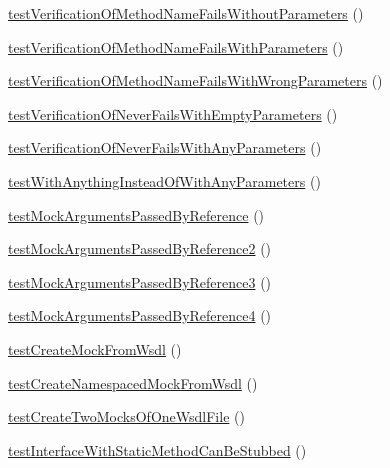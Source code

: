 \begin{DoxyCompactItemize}
\item 
\mbox{\hyperlink{class_framework___mock_object_test_a8fd03f63f74f80e57e0f8313264406ce}{test\+Verification\+Of\+Method\+Name\+Fails\+Without\+Parameters}} ()
\item 
\mbox{\hyperlink{class_framework___mock_object_test_aceab1647e23156ae20515dfc5da0297e}{test\+Verification\+Of\+Method\+Name\+Fails\+With\+Parameters}} ()
\item 
\mbox{\hyperlink{class_framework___mock_object_test_a8bfaa14e7994fda577f1da99ee80ef9d}{test\+Verification\+Of\+Method\+Name\+Fails\+With\+Wrong\+Parameters}} ()
\item 
\mbox{\hyperlink{class_framework___mock_object_test_a7ede9367c10f90c85b379d24b1d5134f}{test\+Verification\+Of\+Never\+Fails\+With\+Empty\+Parameters}} ()
\item 
\mbox{\hyperlink{class_framework___mock_object_test_abecd95f868ca4ee89ebcdbb6b9bfd6d9}{test\+Verification\+Of\+Never\+Fails\+With\+Any\+Parameters}} ()
\item 
\mbox{\hyperlink{class_framework___mock_object_test_afd2f82457d121beb8ea83d5c8593e90e}{test\+With\+Anything\+Instead\+Of\+With\+Any\+Parameters}} ()
\item 
\mbox{\hyperlink{class_framework___mock_object_test_afeba4ff44945c88e8984329704c02ad5}{test\+Mock\+Arguments\+Passed\+By\+Reference}} ()
\item 
\mbox{\hyperlink{class_framework___mock_object_test_a3808e825ed9c8d535478667acb463d28}{test\+Mock\+Arguments\+Passed\+By\+Reference2}} ()
\item 
\mbox{\hyperlink{class_framework___mock_object_test_ab5f5ef43b4f85ce822d4df49c0f5586b}{test\+Mock\+Arguments\+Passed\+By\+Reference3}} ()
\item 
\mbox{\hyperlink{class_framework___mock_object_test_ab26370fce4c589ca891b4a7d06eb4b24}{test\+Mock\+Arguments\+Passed\+By\+Reference4}} ()
\item 
\mbox{\hyperlink{class_framework___mock_object_test_aed1791ffc5e87500d8d91d5ae31a54d6}{test\+Create\+Mock\+From\+Wsdl}} ()
\item 
\mbox{\hyperlink{class_framework___mock_object_test_ab08e3136dd60f0f44fa2c44519a45660}{test\+Create\+Namespaced\+Mock\+From\+Wsdl}} ()
\item 
\mbox{\hyperlink{class_framework___mock_object_test_a4b9afb7aec38259f3f2bcaa5e4b3a0d7}{test\+Create\+Two\+Mocks\+Of\+One\+Wsdl\+File}} ()
\item 
\mbox{\hyperlink{class_framework___mock_object_test_a226859d52cb204968b7efedf060d1569}{test\+Interface\+With\+Static\+Method\+Can\+Be\+Stubbed}} ()

\end{DoxyCompactItemize}

